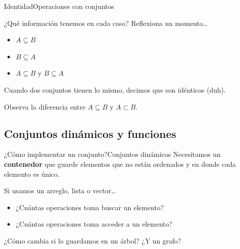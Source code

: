 \documentclass[spanish, c]{beamer}
\begin{document}
\begin{frame}{Identidad}{Operaciones con conjuntos}

    ¿Qué información tenemos en cada caso? Reflexiona un momento\dots \pause

    \bigskip

    \begin{itemize}[<+->]
        \item $A \subseteq B$
        \item $B \subseteq A$
        \item $A \subseteq B$ y $B \subseteq A$
    \end{itemize} \pause

    Cuando dos conjuntos tienen lo mismo, decimos que son \alert{idénticos} {\tiny (duh)}.

    \bigskip \pause

    Observa la diferencia entre $A \subseteq B$ y $A \subset B$.
\end{frame}

\subsection{Conjuntos dinámicos y funciones}

\begin{frame}{¿Cómo implementar un conjunto?}{Conjuntos dinámicos}
    Necesitamos un \textbf{contenedor} que guarde elementos que no están ordenados y en donde cada elemento es único. \pause

    \bigskip

    Si usamos un arreglo, lista o vector\dots

    \bigskip

    \begin{itemize}[<+->]
        \item ¿Cuántas operaciones toma buscar un elemento?
        \item ¿Cuántas operaciones toma acceder a un elemento?
    \end{itemize}

    \bigskip

    \pause ¿Cómo cambia si lo guardamos en un árbol? \pause ¿Y un grafo?

\end{frame}
\end{document}
